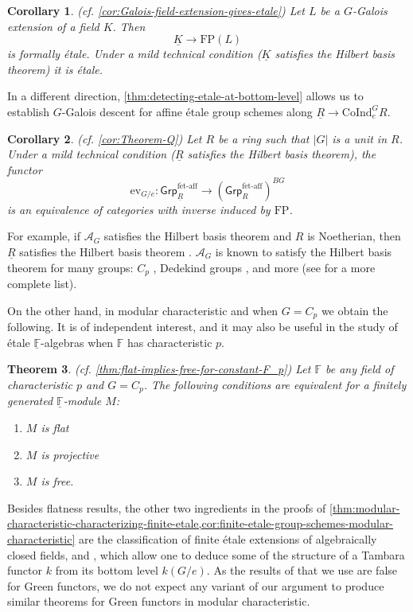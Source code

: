 \documentclass[11pt,dvipsnames]{amsart}
\newcommand{\A}{\mathcal{A}}
\newcommand{\F}{\mathbb{F}}
\newtheorem{letterthm}{Theorem}
\newtheorem{lettercor}[letterthm]{Corollary}
\theoremstyle{BoldRemark}
\newcommand{\Coind}{\mathrm{CoInd}}
\newcommand{\FP}{\mathrm{FP}}
\newcommand{\ev}{\mathrm{ev}}
\newcommand{\fet}{\mathsf{Grp}^{\mathrm{f\acute{e}t\text{-}aff}}}
\begin{document}
\begin{lettercor}(cf. \cref{cor:Galois-field-extension-gives-etale})
    Let $L$ be a $G$-Galois extension of a field $K$. Then
    \[ 
        \underline{K} \rightarrow \FP(L) 
    \] 
    is formally \'{e}tale. Under a mild technical condition ($\underline{K}$ satisfies the Hilbert basis theorem) it is \'{e}tale.
\end{lettercor}

In a different direction, \cref{thm:detecting-etale-at-bottom-level} allows us to establish $G$-Galois descent for affine \'{e}tale group schemes along $\underline{R} \rightarrow \Coind_e^G R$.

\begin{lettercor}(cf. \cref{cor:Theorem-Q})
    Let $R$ be a ring such that $|G|$ is a unit in $R$. Under a mild technical condition ($\underline{R}$ satisfies the Hilbert basis theorem), the functor 
    \[ 
        \ev_{G/e} : \fet_{\underline{R}} \rightarrow (\fet_R)^{BG} 
    \] 
    is an equivalence of categories with inverse induced by $\FP$.
\end{lettercor}

For example, if $\A_G$ satisfies the Hilbert basis theorem and $R$ is Noetherian, then $\underline{R}$ satisfies the Hilbert basis theorem \cite{Sun25}. $\A_G$ is known to satisfy the Hilbert basis theorem for many groups: $C_p$ \cite{4DS}, Dedekind groups \cite{Sun25}, and more (see \cite{Sun25} for a more complete list).

On the other hand, in modular characteristic and when $G = C_p$ we obtain the following. It is of independent interest, and it may also be useful in the study of \'{e}tale $\underline{\F}$-algebras when $\F$ has characteristic $p$.

\begin{letterthm}(cf. \cref{thm:flat-implies-free-for-constant-F_p})
    Let $\F$ be any field of characteristic $p$ and $G = C_p$. The following conditions are equivalent for a finitely generated $\underline{\F}$-module $M$: 
    \begin{enumerate}
        \item $M$ is flat
        \item $M$ is projective
        \item $M$ is free.
    \end{enumerate}
\end{letterthm}

Besides flatness results, the other two ingredients in the proofs of \cref{thm:modular-characteristic-characterizing-finite-etale,cor:finite-etale-group-schemes-modular-characteristic} are the classification of finite \'{e}tale extensions of algebraically closed fields, and \cite[Propositions 3.6 and 3.8]{Wis25a}, which allow one to deduce some of the structure of a Tambara functor $k$ from its bottom level $k(G/e)$. As the results of \cite{Wis25a} that we use are false for Green functors, we do not expect any variant of our argument to produce similar theorems for Green functors in modular characteristic.
\end{document}
